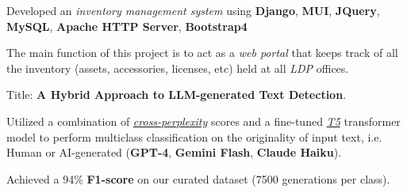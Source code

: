 \documentclass[]{openfont}
\begin{document}
\begin{minipage}[t]{0.65\textwidth}
    \begin{tightemize}
        \item Developed an \textit{inventory management system} using \textbf{Django}, \textbf{MUI}, \textbf{JQuery}, \textbf{MySQL}, \textbf{Apache HTTP Server}, \textbf{Bootstrap4}
        \item The main function of this project is to act as a \textit{web portal} that keeps track of all the inventory (assets, accessories, licenses, etc) held at all \textit{LDP} offices.
    \end{tightemize}
    \sectionsep

    \begin{tightemize}
        \item Title: \textbf{A Hybrid Approach to LLM-generated Text Detection}.
        \item Utilized a combination of \href{https://huggingface.co/spaces/evaluate-metric/perplexity}{\textit{cross-perplexity}} scores and a fine-tuned \href{https://en.wikipedia.org/wiki/T5_(language_model)}{\textit{T5}} transformer model to perform multiclass classification on the originality of input text, i.e. Human or AI-generated (\textbf{GPT-4}, \textbf{Gemini Flash}, \textbf{Claude Haiku}).
        \item Achieved a 94\% \textbf{F1-score} on our curated dataset (7500 generations per class).
    \end{tightemize}


\end{minipage}
\end{document}
